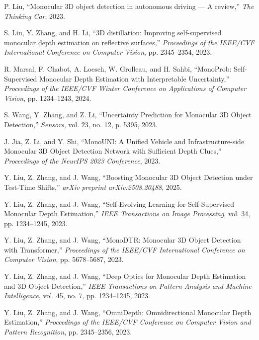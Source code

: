 \documentclass[12pt,oneside]{book}
\begin{document}
\begin{thebibliography}{99}
P. Liu,
``Monocular 3D object detection in autonomous driving — A review,''
\emph{The Thinking Car}, 2023.

S. Liu, Y. Zhang, and H. Li,
``3D distillation: Improving self-supervised monocular depth estimation on reflective surfaces,''
\emph{Proceedings of the IEEE/CVF International Conference on Computer Vision}, pp. 2345--2354, 2023.

R. Marsal, F. Chabot, A. Loesch, W. Grolleau, and H. Sahbi,
``MonoProb: Self-Supervised Monocular Depth Estimation with Interpretable Uncertainty,''
\emph{Proceedings of the IEEE/CVF Winter Conference on Applications of Computer Vision}, pp. 1234--1243, 2024.

S. Wang, Y. Zhang, and Z. Li,
``Uncertainty Prediction for Monocular 3D Object Detection,''
\emph{Sensors}, vol. 23, no. 12, p. 5395, 2023.

J. Jia, Z. Li, and Y. Shi,
``MonoUNI: A Unified Vehicle and Infrastructure-side Monocular 3D Object Detection Network with Sufficient Depth Clues,''
\emph{Proceedings of the NeurIPS 2023 Conference}, 2023.

Y. Liu, Z. Zhang, and J. Wang,
``Boosting Monocular 3D Object Detection under Test-Time Shifts,''
\emph{arXiv preprint arXiv:2508.20488}, 2025.

Y. Liu, Z. Zhang, and J. Wang,
``Self-Evolving Learning for Self-Supervised Monocular Depth Estimation,''
\emph{IEEE Transactions on Image Processing}, vol. 34, pp. 1234--1245, 2023.

Y. Liu, Z. Zhang, and J. Wang,
``MonoDTR: Monocular 3D Object Detection with Transformer,''
\emph{Proceedings of the IEEE/CVF International Conference on Computer Vision}, pp. 5678--5687, 2023.

Y. Liu, Z. Zhang, and J. Wang,
``Deep Optics for Monocular Depth Estimation and 3D Object Detection,''
\emph{IEEE Transactions on Pattern Analysis and Machine Intelligence}, vol. 45, no. 7, pp. 1234--1245, 2023.

Y. Liu, Z. Zhang, and J. Wang,
``OmniDepth: Omnidirectional Monocular Depth Estimation,''
\emph{Proceedings of the IEEE/CVF Conference on Computer Vision and Pattern Recognition}, pp. 2345--2356, 2023.

\end{thebibliography}
\end{document}
